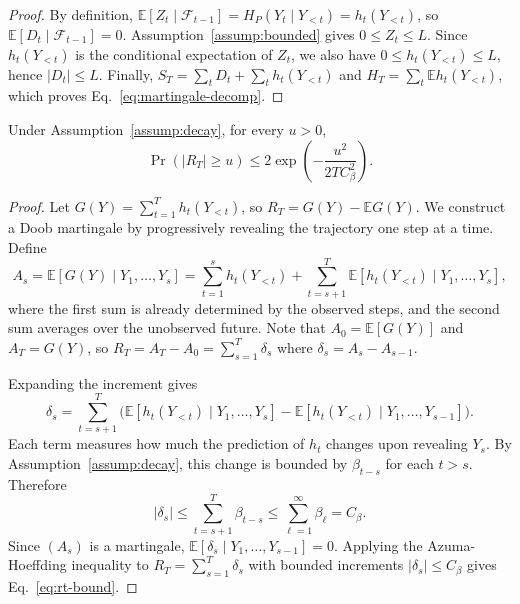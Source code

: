 \begin{proof}
By definition,
$\mathbb{E}[Z_t\mid \mathcal{F}_{t-1}] = H_P(Y_t\mid Y_{<t}) = h_t(Y_{<t})$,
so $\mathbb{E}[D_t\mid\mathcal{F}_{t-1}]=0$. Assumption~\ref{assump:bounded} gives $0\le Z_t\le L$. Since $h_t(Y_{<t})$ is the conditional expectation of $Z_t$, we also have $0\le h_t(Y_{<t})\le L$, hence $|D_t|\le L$. Finally, $S_T=\sum_t D_t + \sum_t h_t(Y_{<t})$ and $H_T=\sum_t\mathbb{E}h_t(Y_{<t})$, which proves Eq.~\eqref{eq:martingale-decomp}.
\end{proof}

\begin{lemma}[Concentration of $R_T$]
\label{lem:rt}
Under Assumption~\ref{assump:decay}, for every $u>0$,
\begin{equation}
  \Pr(|R_T|\ge u)
  \le 2\exp\!\left(-\frac{u^2}{2TC_\beta^2}\right).
  \label{eq:rt-bound}
\end{equation}
\end{lemma}

\begin{proof}
Let $G(Y)=\sum_{t=1}^{T}h_t(Y_{<t})$, so $R_T=G(Y)-\mathbb{E}G(Y)$. We construct a Doob martingale by progressively revealing the trajectory one step at a time. Define
\begin{equation}
  A_s=\mathbb{E}[G(Y)\mid Y_1,\dots,Y_s]
  = \sum_{t=1}^{s} h_t(Y_{<t}) + \sum_{t=s+1}^{T} \mathbb{E}[h_t(Y_{<t})\mid Y_1,\dots,Y_s],
\end{equation}
where the first sum is already determined by the observed steps, and the second sum averages over the unobserved future. Note that $A_0 = \mathbb{E}[G(Y)]$ and $A_T = G(Y)$, so $R_T = A_T - A_0 = \sum_{s=1}^{T}\delta_s$ where $\delta_s = A_s - A_{s-1}$.

Expanding the increment gives
\begin{equation}
  \delta_s = \sum_{t=s+1}^{T}\Big(\mathbb{E}[h_t(Y_{<t})\mid Y_1,\dots,Y_s] - \mathbb{E}[h_t(Y_{<t})\mid Y_1,\dots,Y_{s-1}]\Big).
\end{equation}
Each term measures how much the prediction of $h_t$ changes upon revealing $Y_s$. By Assumption~\ref{assump:decay}, this change is bounded by $\beta_{t-s}$ for each $t>s$. Therefore
\begin{equation}
  |\delta_s|\le \sum_{t=s+1}^{T}\beta_{t-s}\le \sum_{\ell=1}^{\infty}\beta_\ell = C_\beta.
\end{equation}
Since $(A_s)$ is a martingale, $\mathbb{E}[\delta_s\mid Y_1,\dots,Y_{s-1}]=0$. Applying the Azuma-Hoeffding inequality to $R_T=\sum_{s=1}^{T}\delta_s$ with bounded increments $|\delta_s|\le C_\beta$ gives Eq.~\eqref{eq:rt-bound}.
\end{proof}

